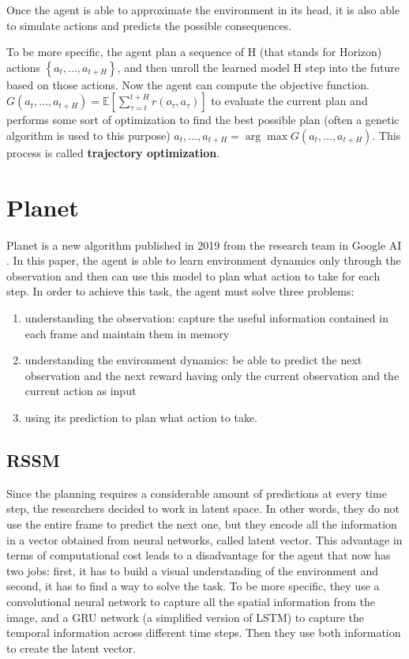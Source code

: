 Once the agent is able to approximate the environment in its head, it is also able to  simulate actions and predicts the possible consequences.

To be more specific, the agent plan a sequence of H (that stands for Horizon) actions $ \left\{ a_{t},\ldots, a_{t+H}\right\}$, and then unroll the learned model H step into the future based on those actions.
Now the agent can compute the objective function. 
$ G\left(a_{t}, \ldots, a_{t+H}\right) =\mathbb{E}\left[\sum_{\tau=t}^{t+H} r\left(o_{\tau}, a_{\tau}\right)\right] $ to evaluate the current plan and performs some sort of optimization to find the best possible plan (often a genetic algorithm is used to this purpose)
$ a_{t}, \ldots, a_{t+H} =\arg \max G\left(a_{t}, \ldots, a_{t+H}\right) $.
This process is called  \textbf{trajectory optimization}.


\section{Planet}
Planet is a new algorithm published in 2019 from the research team in Google AI \cite{hafner2019learning}.
In this paper, the agent is able to learn environment dynamics only through the observation and then can use this model to plan what action to take for each step.
In order to achieve this task, the agent must solve three problems:

\begin{enumerate}
\item understanding the observation: capture the useful information contained in each frame and maintain them in memory
\item understanding the environment dynamics: be able to predict the next observation and the next reward having only the current observation and the current action as input
\item using its prediction to plan what action to take.
\end{enumerate}

\subsection{RSSM}
Since the planning requires a considerable amount of predictions at every time step, the researchers decided to work in latent space.
In other words, they do not use the entire frame to predict the next one, but they encode all the information in a vector obtained from neural networks, called latent vector. 
This advantage in terms of computational cost leads to a disadvantage for the agent that now has two jobs: first, it has to build a visual understanding of the environment and second, it has to find a way to solve the task.
To be more specific, they use a convolutional neural network to capture all the spatial information from the image, and a GRU network  (a simplified version of LSTM) to capture the temporal information across different time steps.
Then they use both information to create the latent vector.

